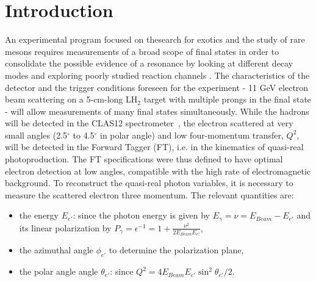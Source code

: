 \section{Introduction}
An experimental program focused on thesearch for exotics and the study of rare mesons requires measurements of a broad scope of final states in order to consolidate the possible evidence of a resonance by looking at different decay modes and exploring poorly studied reaction channels \cite{mesonex}.
The characteristics of the detector and the trigger conditions foreseen for the experiment - 11 GeV electron beam scattering on a 5-cm-long LH$_2$ target with multiple prongs in the final state - will allow  measurements of many final states simultaneously. While the hadrons will be detected in the CLAS12 spectrometer~\cite{overview}, the electron scattered at very small angles (2.5$^\circ$ to 4.5$^\circ$ in polar angle) and low four-momentum transfer, $Q^2$,  will be detected in the Forward Tagger (FT), i.e. in the kinematics of quasi-real photoproduction.
The FT  specifications  were thus defined to have optimal electron detection at low angles, compatible with the high rate of electromagnetic background.
To reconstruct the  quasi-real photon variables, it is necessary to measure the scattered electron three momentum.
The relevant quantities are:
\begin{itemize}
\item the energy $E_{e'}$: since the photon energy is given by $E_\gamma =\nu=E_{Beam}-E_{e'}$ and its linear polarization
 by $P_\gamma=\epsilon^{-1}=1+\frac{\nu^2}{2 E_{Beam} E_{e'}}$,
\item the azimuthal angle $\phi_{e'}$ to determine the polarization plane, 
\item the polar angle angle $\theta_{e'}$: since $Q^2 = 4 E_{Beam} E_{e'} \sin^2{\theta_{e'}/2}$.
\end{itemize}

